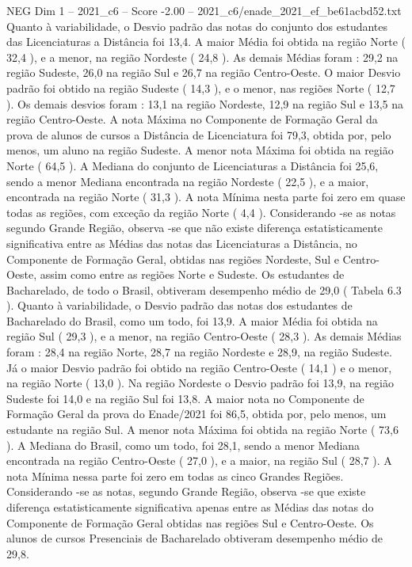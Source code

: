 \begin{textsample}{NEG Dim 1 – 2021\_c6 – Score -2.00 – 2021\_c6/enade\_2021\_ef\_be61acbd52.txt}
Quanto à variabilidade, o Desvio padrão das notas do conjunto dos estudantes das Licenciaturas a Distância foi 13,4.
A maior Média foi obtida na região Norte ( 32,4 ), e a menor, na região Nordeste ( 24,8 ).
As demais Médias foram : 29,2 na região Sudeste, 26,0 na região Sul e 26,7 na região Centro-Oeste.
O maior Desvio padrão foi obtido na região Sudeste ( 14,3 ), e o menor, nas regiões Norte ( 12,7 ).
Os demais desvios foram : 13,1 na região Nordeste, 12,9 na região Sul e 13,5 na região Centro-Oeste.
A nota Máxima no Componente de Formação Geral da prova de alunos de cursos a Distância de Licenciatura foi 79,3, obtida por, pelo menos, um aluno na região Sudeste.
A menor nota Máxima foi obtida na região Norte ( 64,5 ).
A Mediana do conjunto de Licenciaturas a Distância foi 25,6, sendo a menor Mediana encontrada na região Nordeste ( 22,5 ), e a maior, encontrada na região Norte ( 31,3 ).
A nota Mínima nesta parte foi zero em quase todas as regiões, com exceção da região Norte ( 4,4 ).
Considerando -se as notas segundo Grande Região, observa -se que não existe diferença estatisticamente significativa entre as Médias das notas das Licenciaturas a Distância, no Componente de Formação Geral, obtidas nas regiões Nordeste, Sul e Centro-Oeste, assim como entre as regiões Norte e Sudeste.
Os estudantes de Bacharelado, de todo o Brasil, obtiveram desempenho médio de 29,0 ( Tabela 6.3 ).
Quanto à variabilidade, o Desvio padrão das notas dos estudantes de Bacharelado do Brasil, como um todo, foi 13,9.
A maior Média foi obtida na região Sul ( 29,3 ), e a menor, na região Centro-Oeste ( 28,3 ).
As demais Médias foram : 28,4 na região Norte, 28,7 na região Nordeste e 28,9, na região Sudeste.
Já o maior Desvio padrão foi obtido na região Centro-Oeste ( 14,1 ) e o menor, na região Norte ( 13,0 ).
Na região Nordeste o Desvio padrão foi 13,9, na região Sudeste foi 14,0 e na região Sul foi 13,8.
A maior nota no Componente de Formação Geral da prova do Enade/2021 foi 86,5, obtida por, pelo menos, um estudante na região Sul.
A menor nota Máxima foi obtida na região Norte ( 73,6 ).
A Mediana do Brasil, como um todo, foi 28,1, sendo a menor Mediana encontrada na região Centro-Oeste ( 27,0 ), e a maior, na região Sul ( 28,7 ).
A nota Mínima nessa parte foi zero em todas as cinco Grandes Regiões.
Considerando -se as notas, segundo Grande Região, observa -se que existe diferença estatisticamente significativa apenas entre as Médias das notas do Componente de Formação Geral obtidas nas regiões Sul e Centro-Oeste.
Os alunos de cursos Presenciais de Bacharelado obtiveram desempenho médio de 29,8.

\end{textsample}
